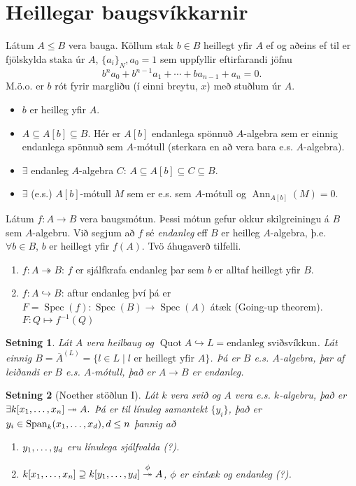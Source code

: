 \documentclass[a4paper, 14pt]{article}
\DeclareMathOperator{\Spec}{Spec}
\DeclareMathOperator{\Ann}{Ann}
\DeclareMathOperator{\Quot}{Quot}
\DeclareMathOperator{\Span}{Span}
\newtheorem{theorem}{Setning}
\begin{document}
\section{Heillegar baugsvíkkarnir}
Látum $A \leq B$ vera bauga. Köllum stak $b \in B$ heillegt yfir $A$ ef og aðeins ef til er
fjölskylda staka úr $A$, $\{ a_i \}_N, a_0 = 1$ sem uppfyllir eftirfarandi jöfnu
\[
    b^n a_0 + b^{n-1} a_1 + \cdots + ba_{n-1} + a_n = 0.
\]
M.ö.o. er $b$ rót fyrir margliðu (í einni breytu, $x$) með stuðlum úr $A$.
\begin{itemize}[label=$\iff$]
\item $b$ er heilleg yfir $A$.
\item $A \subseteq A[b] \subseteq B$. Hér er $A[b]$ endanlega spönnuð $A$-algebra sem er einnig endanlega spönnuð sem $A$-mótull (sterkara en að vera bara e.s. $A$-algebra).  
\item $\exists$ endanleg $A$-algebra $C$: $A \subseteq A[b] \subseteq C \subseteq B$.
\item $\exists$ (e.s.) $A[b]$-mótull $M$ sem er e.s. sem $A$-mótull og $\Ann_{A[b]}(M) = 0$.
\end{itemize}

Látum $f: A \to B$ vera baugsmótun. Þessi mótun gefur okkur skilgreiningu á $B$ sem $A$-algebru.
Við segjum að $f$ sé \emph{endanleg} eff $B$ er heilleg $A$-algebra, þ.e. $\forall b \in B$, $b$ er heillegt yfir $f(A)$. 
Tvö áhugaverð tilfelli.
\begin{enumerate}
\item $f: A \twoheadrightarrow B$: $f$ er sjálfkrafa endanleg þar sem $b$ er alltaf heillegt yfir $B$.
\item $f: A \hookrightarrow B$: aftur endanleg því þá er $F=\Spec(f) : \Spec(B) \to \Spec(A)$ átæk (Going-up theorem).
    $F: Q \mapsto f^{-1}(Q)$ 
\end{enumerate}

\begin{theorem}
Lát $A$ vera heilbaug og $\Quot A \hookrightarrow L = \text{endanleg sviðsvíkkun}$.
Lát einnig $B = \overline{A}^{(L)} = \{ l \in L \mid l \text{ er heillegt yfir } A \}$.
Þá er $B$ e.s. $A$-algebra, þar af leiðandi er $B$ e.s. $A$-mótull, það er $A \to B$ er endanleg.
\end{theorem}

\begin{theorem}[Noether stöðlun I]
 Lát $k$ vera svið og $A$ vera e.s. $k$-algebru, það er $\exists k[\xs] \twoheadrightarrow A.$
Þá er til línuleg samantekt $\{ y_i \}$, það er $y_i \in \Span_k(\xs[x][d]), d \leq n$ þannig að 
\begin{enumerate}
\item $\xs[y][d]$ eru línulega sjálfvalda (?).
\item  $k[\xs] \supseteq k[\xs[y][d]] \overset{\phi}{\twoheadrightarrow} A$, $\phi$ er eintæk og endanleg (?).
\end{enumerate}
\end{theorem}
\end{document}
